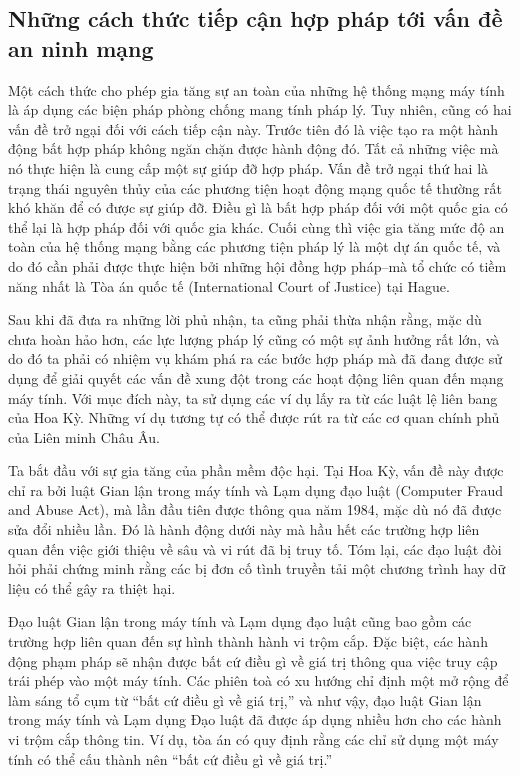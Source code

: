 \subsection*{Những cách thức tiếp cận hợp pháp tới vấn đề an ninh mạng}
Một cách thức cho phép gia tăng sự an toàn của những hệ thống mạng máy tính là áp dụng các
biện pháp phòng chống mang tính pháp lý. Tuy nhiên, cũng có hai vấn đề trở ngại đối với
cách tiếp cận này. Trước tiên đó là việc tạo ra một hành động bất hợp pháp không ngăn chặn
được hành động đó. Tất cả những việc mà nó thực hiện là cung cấp một sự giúp đỡ hợp
pháp. Vấn đề trở ngại thứ hai là trạng thái nguyên thủy của các phương tiện hoạt động mạng
quốc tế thường rất khó khăn để có được sự giúp đỡ. Điều gì là bất hợp pháp đối với một
quốc gia có thể lại là hợp pháp đối với quốc gia khác. Cuối cùng thì việc gia tăng mức độ
an toàn của hệ thống mạng bằng các phương tiện pháp lý là một dự án quốc tế, và do đó cần
phải được thực hiện bởi những hội đồng hợp pháp--mà tổ chức có tiềm năng nhất là Tòa án
quốc tế (International Court of Justice) tại Hague.

Sau khi đã đưa ra những lời phủ nhận, ta cũng phải thừa nhận rằng, mặc dù chưa hoàn
hảo hơn, các lực lượng pháp lý cũng có một sự ảnh hưởng rất lớn, và do đó ta phải có
nhiệm vụ khám phá ra các bước hợp pháp mà đã đang được sử dụng để giải quyết các vấn đề
xung đột trong các hoạt động liên quan đến mạng máy tính. Với mục đích này, ta sử
dụng các ví dụ lấy ra từ các luật lệ liên bang của Hoa Kỳ. Những ví dụ tương tự có thể
được rút ra từ các cơ quan chính phủ của Liên minh Châu Âu.

Ta bắt đầu với sự gia tăng của phần mềm độc hại. Tại Hoa Kỳ, vấn đề này được chỉ ra
bởi luật Gian lận trong máy tính và Lạm dụng đạo luật (Computer Fraud and Abuse Act), mà
lần đầu tiên được thông qua năm 1984, mặc dù nó đã được sửa đổi nhiều lần. Đó là hành động
dưới này mà hầu hết các trường hợp liên quan đến việc giới thiệu về sâu và vi rút đã bị
truy tố. Tóm lại, các đạo luật đòi hỏi phải chứng minh rằng các bị đơn cố tình truyền tải
một chương trình hay dữ liệu có thể gây ra thiệt hại.


Đạo luật Gian lận trong máy tính và Lạm dụng đạo luật cũng bao gồm các trường hợp liên
quan đến sự hình thành hành vi trộm cắp. Đặc biệt, các hành động phạm pháp sẽ nhận được
bất cứ điều gì về giá trị thông qua việc truy cập trái phép vào một máy tính. Các phiên
toà có xu hướng chỉ định một mở rộng để làm sáng tổ cụm từ ``bất cứ điều gì về giá trị,''
và như vậy, đạo luật Gian lận trong máy tính và Lạm dụng Đạo luật đã được áp dụng nhiều
hơn cho các hành vi trộm cắp thông tin. Ví dụ, tòa án có quy định rằng các chỉ sử dụng một
máy tính có thể cấu thành nên ``bất cứ điều gì về giá trị.''

